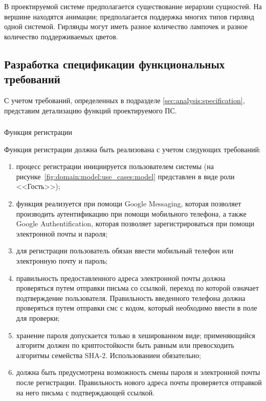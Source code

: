 В проектируемой системе предполагается существование иерархии сущностей. На вершине находятся анимации; предполагается поддержка многих типов гирлянд одной системой. Гирлянды могут иметь разное количество лампочек и разное количество поддерживаемых цветов.

\subsection{Разработка спецификации функциональных требований}
\label{sec:domain:specification}

С учетом требований, определенных в подразделе \ref{sec:analysis:specification}, представим детализацию функций проектируемого ПС.

\subsubsection{ } Функция регистрации 
\label{sec:domain:specification:signup}


Функция регистрации должна быть реализована с учетом следующих требований:

\begin{enumerate}
	\item процесс регистрации инициируется пользователем системы (на рисунке~\ref{fig:domain:model:use_cases:model} представлен в виде роли <<Гость>>);
	\item функция реализуется при помощи Google Messaging, которая позволяет производить аутентификацию при помощи мобильного телефона, а также Google Authentification, которая позволяет зарегистрироваться при помощи электронной почты и пароля;
	\item для регистрации пользователь обязан ввести мобильный телефон или электронную почту и пароль;
	\item правильность предоставленного адреса электронной почты должна проверяться путем отправки письма со ссылкой, переход по которой означает подтверждение пользователя. Правильность введенного телефона должна проверяться путем отправки смс с кодом, который необходимо ввести в поле для проверки;
	\item хранение пароля допускается только в хешированном виде; применяющийся алгоритм должен по криптостойкости быть равным или превосходить алгоритмы семейства SHA-2. Использованиеи обязательно;
	\item должна быть предусмотрена возможность смены пароля и электронной почты после регистрации. Правильность нового адреса почты проверяется отправкой на него письма с подтверждающей ссылкой.
\end{enumerate}

